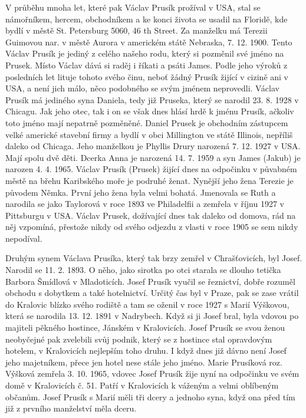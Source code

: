 \documentclass[../dejiny-rodu-prusiku.tex]{subfiles}
\begin{document}
V průběhu mnoha let, které pak Václav Prusík pro­žíval v USA, stal se námořníkem, hercem, obchodníkem a ke konci života se usadil na Floridě, kde bydlí v městě St. Petersburg 5060, 46 th Street. Za manželku má Terezii Guimovou nar. v městě Aurora v americkém státě Nebraska, 7. 12. 1900. Tento Václav Prusík je je­diný z celého našeho rodu, který si pozměnil své jméno na Prusek. Místo Václav dává si raděj i říkati a psáti James. Podle jeho výroků z posledních let lituje tohoto svého činu, neboť žádný Prusík žijící v cizině ani v USA, a není jich málo, něco podobného se svým jménem neprovedli. Václav Prusík má jediného syna Daniela, tedy již Pruseka, který se narodil 23. 8. 1928 v Chicagu. Jak jeho otec, tak i on se však dnes hlásí hrdě k jménu Prusík, ačkoliv toto jméno mají nepatrně pozměněné. Daniel Prusek je obchodním zástupcem velké americké stavební firmy a bydlí v obci Millington ve státě Illinois, nepříliš daleko od Chicaga.  Jeho manželkou je Phyllis Drury narozená 7. 12. 1927 v USA. Mají spolu dvě děti. Dcerka Anna je narozená 14. 7. 1959 a syn James (Jakub) je narozen 4. 4. 1965. Václav Prusík (Prusek) žijící dnes na odpo­činku v půvabném městě na břehu Karibského moře je podruhé ženat. Nynější jeho žena Terezie je původem Němka. První jeho žena byla velmi bohatá. Jmenovala se Ruth a narodila se jako Taylorová v roce 1893 ve Philadelfii a zemřela v říjnu 1927 v Pittsburgu v USA. Václav Prusek, dožívající dnes tak daleko od domova, rád na něj vzpomíná, přestože nikdy od svého odjezdu z vlasti v roce 1905 se sem nikdy nepodíval.

Druhým synem Václava Prusíka, který tak brzy zemřel v Chrašťovicích, byl Josef. Narodil se 11. 2. 1893. O něho, jako sirotka po otci starala se dlouho tetička Barbora Šmídlová v Mladoticích. Josef Prusík vyučil se řeznictví, dobře rozuměl obchodu s dobytkem a také hotelnictví. Určitý čas byl v Praze, pak se zase vrá­til do Kralovic blízko svého rodiště a tam se oženil v roce 1927 s Marií Výškovou, která se narodila 13. 12. 1891 v Nadrybech. Když si ji Josef bral, byla vdovou po majiteli pěkného hostince, Jánském v Kralovicích. Josef Prusík se svou ženou neobyčejné pak zvelebili svůj pod­nik, který se z hostince stal opravdovým hotelem, v Kralovicích nejlepším toho druhu. I když dnes již dávno není Josef jeho majetníkem, přece jen hotel nese stále jeho jméno. Marie Prusíková roz. Výšková zemřela 3. 10. 1965, vdovec Josef Prusík žije nyní na odpočinku ve svém domě v Kralovicích č. 51. Patří v Kralovicích k váženým a velmi oblíbeným občanům. Josef Prusík s Marií měli tři dcery a jednoho syna, když ona před tím již z prvního manželství měla dceru.
\end{document}
